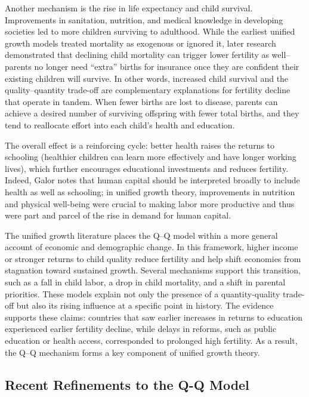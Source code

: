 \documentclass[]{AEA}
\begin{document}
Another mechanism is the rise in life expectancy and child survival.
Improvements in sanitation, nutrition, and medical knowledge in
developing societies led to more children surviving to adulthood. While
the earliest unified growth models treated mortality as exogenous or
ignored it, later research demonstrated that declining child mortality
can trigger lower fertility as well-- parents no longer need ``extra''
births for insurance once they are confident their existing children
will survive. In other words, increased child survival and the
quality--quantity trade-off are complementary explanations for fertility
decline that operate in tandem. When fewer births are lost to disease,
parents can achieve a desired number of surviving offspring with fewer
total births, and they tend to reallocate effort into each child's
health and education.

The overall effect is a reinforcing cycle: better health raises the
returns to schooling (healthier children can learn more effectively and
have longer working lives), which further encourages educational
investments and reduces fertility. Indeed, Galor notes that human
capital should be interpreted broadly to include health as well as
schooling; in unified growth theory, improvements in nutrition and
physical well-being were crucial to making labor more productive and
thus were part and parcel of the rise in demand for human capital.

The unified growth literature places the Q--Q model within a more
general account of economic and demographic change. In this framework,
higher income or stronger returns to child quality reduce fertility and
help shift economies from stagnation toward sustained growth. Several
mechanisms support this transition, such as a fall in child labor, a
drop in child mortality, and a shift in parental priorities. These
models explain not only the presence of a quantity-quality trade-off but
also its rising influence at a specific point in history. The evidence
supports these claims: countries that saw earlier increases in returns
to education experienced earlier fertility decline, while delays in
reforms, such as public education or health access, corresponded to
prolonged high fertility. As a result, the Q--Q mechanism forms a key
component of unified growth theory.

\subsection{Recent Refinements to the Q-Q Model}
\end{document}

